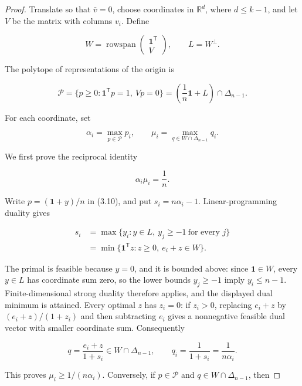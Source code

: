 \documentclass[11pt]{article}
\theoremstyle{remark}
\begin{document}
\begin{proof}
Translate so that \(\bar v=0\), choose coordinates in
\(\mathbb R^d\), where \(d\leq k-1\), and let \(V\) be the matrix with
columns \(v_i\). Define

\[
 W=\operatorname{rowspan}
 \begin{pmatrix}\mathbf1^{\mathsf T}\\V\end{pmatrix},
 \qquad
 L=W^\perp.                                                 \tag{3.9}
\]

The polytope of representations of the origin is

\[
 \mathcal P
 =\{p\geq0:\mathbf1^{\mathsf T}p=1,\ Vp=0\}
 =\left(\frac1n\mathbf1+L\right)\cap\Delta_{n-1}.         \tag{3.10}
\]

For each coordinate, set

\[
 \alpha_i=\max_{p\in\mathcal P}p_i,
 \qquad
 \mu_i=\max_{q\in W\cap\Delta_{n-1}}q_i.                \tag{3.11}
\]

We first prove the reciprocal identity

\[
 \boxed{\alpha_i\mu_i=\frac1n.}                            \tag{3.12}
\]

Write \(p=(\mathbf1+y)/n\) in (3.10), and put
\(s_i=n\alpha_i-1\). Linear-programming duality \cite{schrijver1986} gives

\[
 \begin{aligned}
 s_i
 &=\max\{y_i:y\in L,\ y_j\geq-1\ \text{for every }j\}\\
 &=\min\{\mathbf1^{\mathsf T}z:
          z\geq0,\ e_i+z\in W\}.                          
 \end{aligned}                                             \tag{3.13}
\]

The primal is feasible because \(y=0\), and it is bounded above: since
\(\mathbf1\in W\), every \(y\in L\) has coordinate sum zero, so the lower
bounds \(y_j\geq-1\) imply \(y_i\leq n-1\). Finite-dimensional strong
duality therefore applies, and the displayed dual minimum is attained. Every
optimal \(z\) has \(z_i=0\): if \(z_i>0\), replacing \(e_i+z\) by
\((e_i+z)/(1+z_i)\) and then subtracting \(e_i\) gives a nonnegative feasible
dual vector with smaller coordinate sum. Consequently

\[
 q=\frac{e_i+z}{1+s_i}\in W\cap\Delta_{n-1},
 \qquad
 q_i=\frac1{1+s_i}=\frac1{n\alpha_i}.                      \tag{3.14}
\]

This proves \(\mu_i\geq1/(n\alpha_i)\). Conversely, if
\(p\in\mathcal P\) and \(q\in W\cap\Delta_{n-1}\), then


\end{proof}
\end{document}
